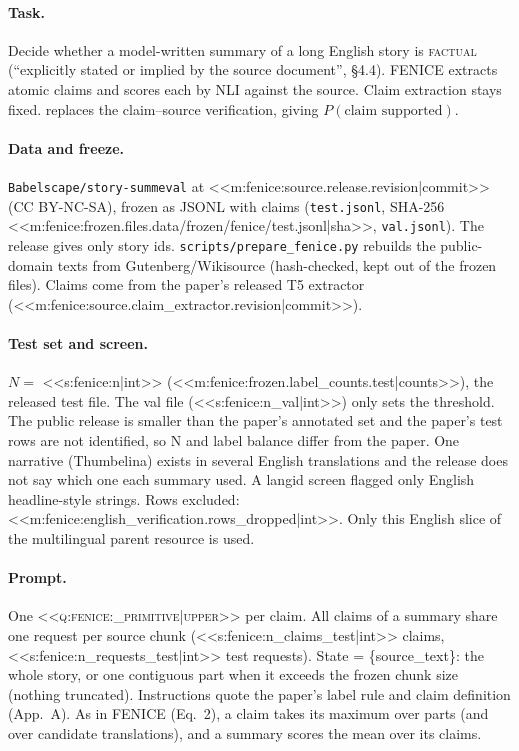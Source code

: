 \paragraph{Task.} Decide whether a model-written summary of a long English story is \textsc{factual} (``explicitly stated or implied
by the source document'', \S4.4). FENICE extracts atomic claims and scores each by NLI against the source. Claim
extraction stays fixed. \jev{} replaces the claim--source verification, giving $P(\text{claim supported})$.

\paragraph{Data and freeze.} \texttt{Babelscape/\allowbreak{}story-summeval} at
<<m:fenice:source.release.revision|commit>> (CC BY-NC-SA), frozen as JSONL with claims
(\texttt{test.jsonl}, SHA-256 <<m:fenice:frozen.files.data/frozen/fenice/test.jsonl|sha>>, \texttt{val.jsonl}).
The release gives only story ids. \texttt{scripts/\allowbreak{}prepare\_fenice.py} rebuilds the public-domain texts
from Gutenberg/Wikisource (hash-checked, kept out of the frozen files). Claims come from the paper's released T5 extractor
(<<m:fenice:source.claim_extractor.revision|commit>>).

\paragraph{Test set and screen.} $N=$ <<s:fenice:n|int>> (<<m:fenice:frozen.label_counts.test|counts>>), the released
test file. The val file (<<s:fenice:n_val|int>>) only sets the threshold. The public release is smaller than the
paper's annotated set and the paper's test rows are not identified, so N and label balance differ from the paper.
One narrative (Thumbelina) exists in several English translations and the release does not say which one each
summary used. A langid screen flagged only English headline-style strings. Rows excluded:
<<m:fenice:english_verification.rows_dropped|int>>. Only this English slice of the multilingual parent resource is
used.

\paragraph{Prompt.} One \textsc{<<q:fenice:_primitive|upper>>} per claim. All claims of a summary share one request
per source chunk (<<s:fenice:n_claims_test|int>> claims, <<s:fenice:n_requests_test|int>> test requests). State =
\{source\_text\}: the whole story, or one contiguous part when it exceeds the frozen chunk size (nothing truncated).
Instructions quote the paper's label rule and claim definition (App.~A). As in FENICE (Eq.~2), a claim takes its
maximum over parts (and over candidate translations), and a summary scores the mean over its claims.

